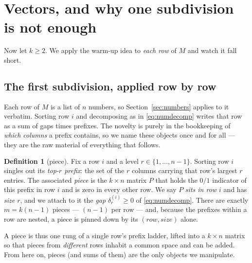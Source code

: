 \documentclass[11pt,a4paper]{article}
\theoremstyle{definition}
\newtheorem{definition}{Definition}[section]
\theoremstyle{plain}
\begin{document}
\section{Vectors, and why one subdivision is not enough}
\label{sec:rows}

Now let $k\ge2$. We apply the warm-up idea to \emph{each row} of $M$ and watch it
fall short.

\subsection{The first subdivision, applied row by row}

Each row of $M$ is a list of $n$ numbers, so Section~\ref{sec:numbers} applies to
it verbatim. Sorting row $i$ and decomposing as in \eqref{eq:numdecomp} writes
that row as a sum of gaps times prefixes. The novelty is purely in the
bookkeeping of \emph{which columns} a prefix contains, so we name these objects
once and for all --- they are the raw material of everything that follows.

\begin{definition}[piece]\label{def:piece}
Fix a row $i$ and a level $r\in\{1,\dots,n-1\}$. Sorting row $i$ singles out its
\emph{top-$r$ prefix}: the set of the $r$ columns carrying that row's largest $r$
entries. The associated \emph{piece} is the $k\times n$ matrix $P$ that holds the
$0/1$ indicator of this prefix in row $i$ and is zero in every other row. We say
$P$ \emph{sits in row $i$} and has \emph{size $r$}, and we attach to it the
\emph{gap} $\delta^{(i)}_r\ge0$ of \eqref{eq:numdecomp}. There are exactly
$m=k(n-1)$ pieces --- $(n-1)$ per row --- and, because the prefixes within a row
are nested, a piece is pinned down by its $(\textit{row},\textit{size})$ alone.
\end{definition}

\noindent
A piece is thus one rung of a single row's prefix ladder, lifted into a
$k\times n$ matrix so that pieces from \emph{different} rows inhabit a common
space and can be added. From here on, pieces (and sums of them) are the only
objects we manipulate.
\end{document}
